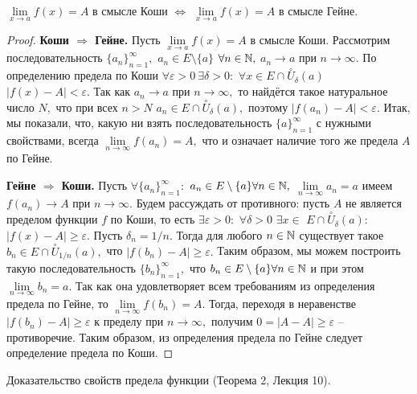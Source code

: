 \begin{theorem}
    $\lim\limits_{x\rightarrow a}f(x)=A$ в смысле Коши
    $\Leftrightarrow$
    $\lim\limits_{x\rightarrow a}f(x)=A$ в смысле Гейне.
\end{theorem}
\begin{proof}
    \textbf{Коши $\Rightarrow$ Гейне.}
    Пусть $\lim\limits_{x\rightarrow a}f(x)=A$ в смысле Коши.
    Рассмотрим последовательность $\{a_n\}_{n=1}^{\infty},$
    $a_n \in E\setminus\{a\}$
    $\forall n \in \mathbb{N},$ $a_n\rightarrow a$
    при $n\rightarrow\infty.$ По определению
    предела по Коши $\forall\varepsilon>0 \ \exists\delta>0:$
    $\forall x \in E \cap \stackrel{\circ}{U}_{\delta}(a)$
    $|f(x)-A|<\varepsilon.$ Так как $a_n\rightarrow a$
    при $n\rightarrow\infty,$ то найдётся такое натуральное
    число $N,$ что при всех $n>N$ $a_n\in
        E\cap\stackrel{\circ}{U}_{\delta}(a),$
    поэтому $|f(a_n)-A|<\varepsilon.$
    Итак, мы показали, что, какую ни взять
    последовательность  $\{a\}_{n=1}^{\infty}$
    с нужными свойствами, всегда
    $\lim\limits_{n\rightarrow\infty}f(a_n)=A,$
    что и означает наличие того же предела
    $A$ по Гейне.

    \textbf{Гейне $\Rightarrow$ Коши.}
    Пусть $\forall \{a_n\}_{n=1}^{\infty}:$
    $a_n \in E\setminus\{a\}\forall n \in \mathbb{N},$
    $\lim\limits_{n\rightarrow\infty}a_n=a$
    имеем $f(a_n)\rightarrow A$ при $n\rightarrow\infty.$
    Будем рассуждать от противного: пусть $A$ не является
    пределом функции $f$ по Коши, то есть
    $\exists\varepsilon>0:$
    $\forall\delta>0$ $\exists x \in$
    $E\cap\stackrel{\circ}{U}_{\delta}(a):$
    $|f(x)-A|\geq\varepsilon.$
    Пусть $\delta_n=1/n.$ Тогда для любого
    $n \in \mathbb{N}$ существует такое $b_n \in
        E\cap\stackrel{\circ}{U}_{1/n}(a),$ что
    $|f(b_n)-A|\geq\varepsilon.$
    Таким образом, мы можем построить такую
    последовательность $\{b_n\}_{n=1}^{\infty},$
    что $b_n \in E\setminus\{a\}\forall n \in \mathbb{N}$
    и при этом $\lim\limits_{n\rightarrow\infty}b_n=a.$
    Так как она удовлетворяет всем требованиям
    из определения предела по Гейне, то
    $\lim\limits_{n\rightarrow\infty}f(b_n)=A.$
    Тогда, переходя в неравенстве $|f(b_n)-A|
        \geq\varepsilon$ к пределу при $n\rightarrow\infty,$
    получим $0=|A-A|\geq\varepsilon$ -- противоречие.
    Таким образом, из определения предела по Гейне
    следует определение предела по Коши.
\end{proof}

\newpage
\begin{problem}
Доказательство свойств предела функции (Теорема 2, Лекция 10).
\end{problem}


